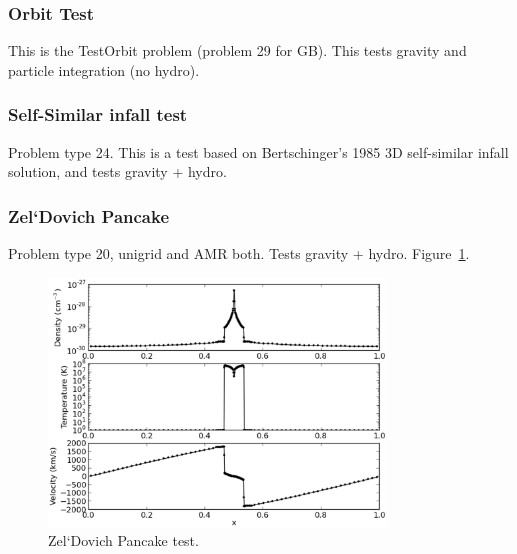 \subsubsection{Orbit Test}
\label{sec.test.testorbit}
This is the TestOrbit problem (problem 29 for GB).  This tests gravity and particle integration (no hydro).

\subsubsection{Self-Similar infall test}
\label{sec.tests.infall}
Problem type 24.  This is a test based on Bertschinger's 1985 3D self-similar infall
solution, and tests gravity + hydro.

\subsubsection{Zel`Dovich Pancake}
\label{sec.tests.pancake}
Problem type 20, unigrid and AMR both.  Tests gravity + hydro.  Figure~\ref{fig.pancake}.

\begin{figure}
\begin{center}
\includegraphics[width=0.8\textwidth]{figures/AMRZeldovichPancake.eps}
\caption{Zel`Dovich Pancake test.}
\label{fig.pancake}
\end{center}
\end{figure}


